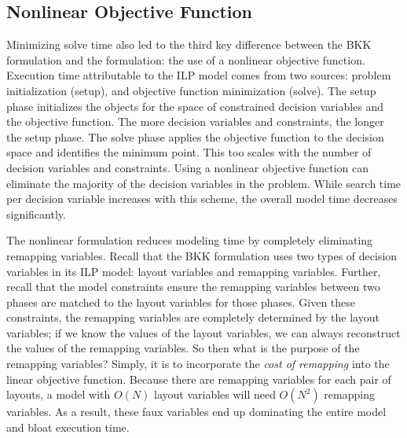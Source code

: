 \subsection{Nonlinear Objective Function}\label{sec:nonlinearFunc}

Minimizing solve time also led to the third key difference between the BKK formulation and the \FormatDecisions{} formulation: the use of a nonlinear objective function.
Execution time attributable to the ILP model comes from two sources: problem initialization (setup), and objective function minimization (solve).
The setup phase initializes the objects for the space of constrained decision variables and the objective function.
The more decision variables and constraints, the longer the setup phase.
The solve phase applies the objective function to the decision space and identifies the minimum point.
This too scales with the number of decision variables and constraints.
Using a nonlinear objective function can eliminate the majority of the decision variables in the problem.
While search time per decision variable increases with this scheme, the overall model time decreases significantly.

The nonlinear formulation reduces modeling time by completely eliminating remapping variables.
Recall that the BKK formulation uses two types of decision variables in its ILP model: layout variables and remapping variables.
Further, recall that the model constraints ensure the remapping variables between two phases are matched to the layout variables for those phases.
Given these constraints, the remapping variables are completely determined by the layout variables; 
if we know the values of the layout variables, we can always reconstruct the values of the remapping variables.
So then what is the purpose of the remapping variables? 
Simply, it is to incorporate the \textit{cost of remapping} into the linear objective function.
Because there are remapping variables for each pair of layouts, a model with $O(N)$ layout variables will need $O(N^2)$ remapping variables.
As a result, these faux variables end up dominating the entire model and bloat execution time.

